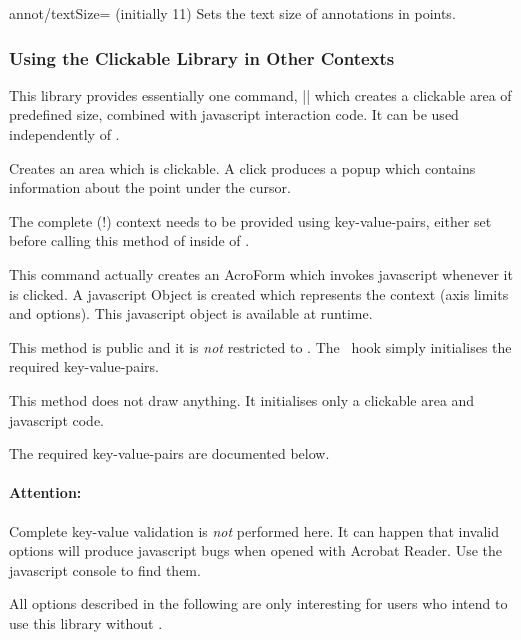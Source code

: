 \begin{pgfplotskey}{annot/textSize= (initially 11)}
	Sets the text size of annotations in points.
\end{pgfplotskey}

\subsubsection{Using the Clickable Library in Other Contexts}
This library provides essentially one command, |\pgfplotsclickablecreate| which creates a clickable area of predefined size, combined with javascript interaction code. It can be used independently of \PGFPlots.

\begin{command}{\pgfplotsclickablecreate{}}
	Creates an area which is clickable. A click produces a popup which
	contains information about the point under the cursor.
	
	The complete (!) context needs to be provided using key-value-pairs, either set before
	calling this method of inside of .
	
	This command actually creates an AcroForm which invokes javascript
	whenever it is clicked. A javascript Object is created which
	represents the context (axis limits and options). This javascript
	object is available at runtime.
	
	This method is public and it is \emph{not} restricted to \PGFPlots.
	The \PGFPlots\ hook simply initialises the required key-value-pairs.

	This method does not draw anything. It initialises only a
	clickable area and javascript code.
	
	The required key-value-pairs are documented below.
	
	\paragraph{Attention:} Complete key-value validation is \emph{not} performed here. It
	can happen that invalid options will produce javascript bugs when
	opened with Acrobat Reader. Use the javascript console to find them.
\end{command}

\noindent All options described in the following are only interesting for users who intend to use this library without \PGFPlots.

